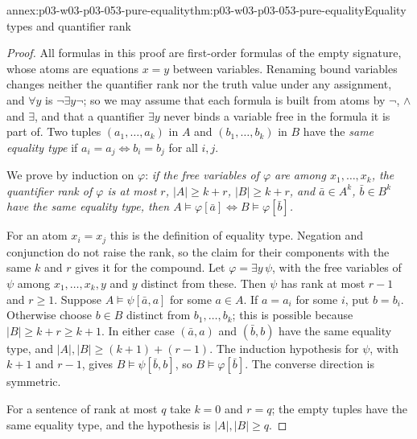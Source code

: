 \begin{annexitem}{annex:p03-w03-p03-053-pure-equality}{thm:p03-w03-p03-053-pure-equality}{Equality types and quantifier rank}
\begin{proof}
All formulas in this proof are first-order formulas of the empty
signature, whose atoms are equations \(x=y\) between variables. Renaming
bound variables changes neither the quantifier rank nor the truth value
under any assignment, and \(\forall y\) is \(\neg\exists y\neg\); so we
may assume that each formula is built from atoms by \(\neg\), \(\land\)
and \(\exists\), and that a quantifier \(\exists y\) never binds a
variable free in the formula it is part of. Two tuples
\((a_1,\ldots,a_k)\) in \(A\) and \((b_1,\ldots,b_k)\) in \(B\) have the
\emph{same equality type} if \(a_i=a_j\iff b_i=b_j\) for all \(i,j\).

We prove by induction on \(\varphi\): \emph{if the free variables of
\(\varphi\) are among \(x_1,\ldots,x_k\), the quantifier rank of
\(\varphi\) is at most \(r\), \(|A|\ge k+r\), \(|B|\ge k+r\), and
\(\bar a\in A^k\), \(\bar b\in B^k\) have the same equality type, then
\(A\models\varphi[\bar a]\iff B\models\varphi[\bar b]\).}

For an atom \(x_i=x_j\) this is the definition of equality type.
Negation and conjunction do not raise the rank, so the claim for their
components with the same \(k\) and \(r\) gives it for the compound. Let
\(\varphi=\exists y\,\psi\), with the free variables of \(\psi\) among
\(x_1,\ldots,x_k,y\) and \(y\) distinct from these. Then \(\psi\) has
rank at most \(r-1\) and \(r\ge1\). Suppose
\(A\models\psi[\bar a,a]\) for some \(a\in A\). If \(a=a_i\) for some
\(i\), put \(b=b_i\). Otherwise choose \(b\in B\) distinct from
\(b_1,\ldots,b_k\); this is possible because \(|B|\ge k+r\ge k+1\). In
either case \((\bar a,a)\) and \((\bar b,b)\) have the same equality
type, and \(|A|,|B|\ge(k+1)+(r-1)\). The induction hypothesis for
\(\psi\), with \(k+1\) and \(r-1\), gives \(B\models\psi[\bar b,b]\), so
\(B\models\varphi[\bar b]\). The converse direction is symmetric.

For a sentence of rank at most \(q\) take \(k=0\) and \(r=q\); the empty
tuples have the same equality type, and the hypothesis is
\(|A|,|B|\ge q\).
\end{proof}
\end{annexitem}

